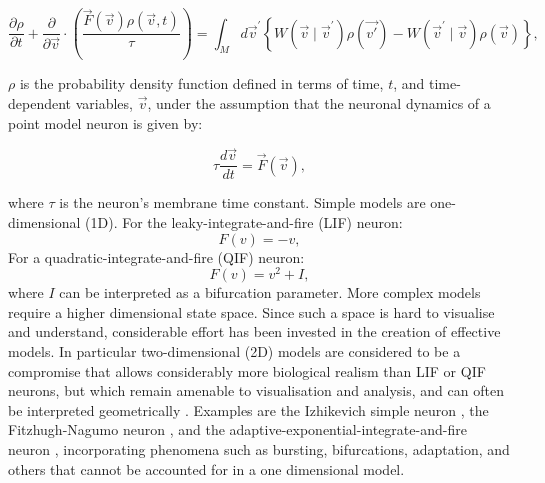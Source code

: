 \documentclass[utf8]{frontiersSCNS} %
\begin{document}
\begin{equation}                                        
  \frac{ \partial \rho }{ \partial t } + \frac{\partial}{ \partial \vec{v}} \cdot ( \frac{\vec{F}(\vec{v}) \rho(\vec{v},t)}{\tau} ) = \int_{M} d \vec{v}^{\prime} \left\{ W(\vec{v} \mid \vec{v}^{\prime})\rho(\vec{v'}) - W(\vec{v}^{\prime} \mid \vec{v}  )\rho(\vec{v}) \right\},
\label{eq-balance}                                          
\end{equation}  

$\rho$ is the probability density function defined in terms of time, $t$, and time-dependent variables, $\vec{v}$, under the assumption that the neuronal dynamics of a point model neuron is given by:

\begin{equation}
\tau \frac{ d \vec{v}}{dt} = \vec{F}(\vec{v}), 
\end{equation}

where $\tau$ is the neuron's membrane time constant. Simple models are one-dimensional (1D). 
For the leaky-integrate-and-fire (LIF) neuron: 
\begin{equation}
F(v) = -v,
\end{equation}  
For a quadratic-integrate-and-fire (QIF) neuron:
\begin{equation}
F(v)= v^2 + I,
\end{equation}  
where $I$ can be interpreted as a bifurcation parameter. More complex models require a higher dimensional state space. Since such a space is hard to visualise and understand, considerable effort has been invested in the creation of effective models. In particular two-dimensional (2D) models are considered to be a compromise that allows considerably more biological realism than LIF or QIF neurons, but which remain amenable to visualisation and analysis, and can often be interpreted geometrically \citep{izhikevich2007dynamical}. Examples are the Izhikevich simple neuron \citep{izhikevich2003simple}, the Fitzhugh-Nagumo neuron \citep{fitzhugh1961impulses,nagumo1962active}, and the adaptive-exponential-integrate-and-fire neuron \citep{brette2005}, incorporating phenomena such as bursting, bifurcations, adaptation, and others that cannot be accounted for in a one dimensional model.
\end{document}
